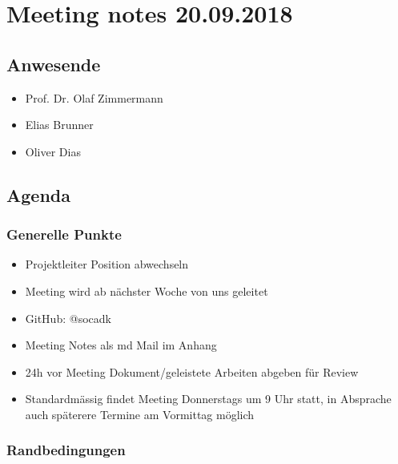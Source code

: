 \hypertarget{meeting-notes-20.09.2018}{%
\section*{Meeting notes 20.09.2018}\label{meeting-notes-20.09.2018}}

\hypertarget{anwesende}{%
\subsection*{Anwesende}\label{anwesende}}

\begin{itemize}

\item
  Prof. Dr. Olaf Zimmermann
\item
  Elias Brunner
\item
  Oliver Dias
\end{itemize}

\hypertarget{agenda}{%
\subsection*{Agenda}\label{agenda}}

\hypertarget{generelle-punkte}{%
\subsubsection*{Generelle Punkte}\label{generelle-punkte}}

\begin{itemize}

\item
  Projektleiter Position abwechseln
\item
  Meeting wird ab nächster Woche von uns geleitet
\item
  GitHub: @socadk
\item
  Meeting Notes als md Mail im Anhang
\item
  24h vor Meeting Dokument/geleistete Arbeiten abgeben für Review
\item
  Standardmässig findet Meeting Donnerstags um 9 Uhr statt, in Absprache
  auch späterere Termine am Vormittag möglich
\end{itemize}

\hypertarget{randbedingungen}{%
\subsubsection*{Randbedingungen}\label{randbedingungen}}

